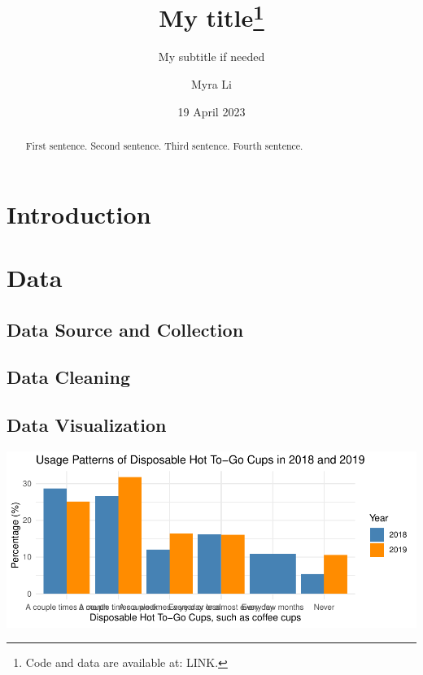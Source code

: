 \documentclass[
  letterpaper,
  DIV=11,
  numbers=noendperiod]{scrartcl}
\title{My title\thanks{Code and data are available at: LINK.}}
\subtitle{My subtitle if needed}
\author{Myra Li}
\date{19 April 2023}
\begin{document}
\maketitle
\begin{abstract}
First sentence. Second sentence. Third sentence. Fourth sentence.
\end{abstract}
\ifdefined\Shaded\renewenvironment{Shaded}{\begin{tcolorbox}[interior hidden, sharp corners, enhanced, frame hidden, breakable, boxrule=0pt, borderline west={3pt}{0pt}{shadecolor}]}{\end{tcolorbox}}\fi

\hypertarget{introduction}{%
\section{Introduction}\label{introduction}}

\hypertarget{sec-data}{%
\section{Data}\label{sec-data}}

\hypertarget{data-source-and-collection}{%
\subsection{Data Source and
Collection}\label{data-source-and-collection}}

\hypertarget{data-cleaning}{%
\subsection{Data Cleaning}\label{data-cleaning}}

\hypertarget{data-visualization}{%
\subsection{Data Visualization}\label{data-visualization}}

\includegraphics{paper_files/figure-pdf/unnamed-chunk-1-1.pdf}
\end{document}
